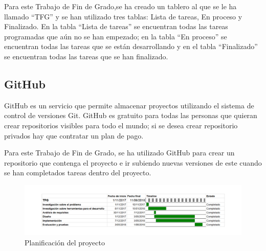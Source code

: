 Para este Trabajo de Fin de Grado,se ha creado un tablero al que se le ha llamado \enquote{TFG} y se han utilizado tres tablas: Lista de tareas, En proceso y Finalizado. En la tabla \enquote{Lista de tareas} se encuentran todas las tareas programadas que aún no se han empezado; en la tabla \enquote{En proceso} se encuentran todas las tareas que se están desarrollando y en el tabla \enquote{Finalizado} se encuentran todas las tareas que se han finalizado.
\subsection{GitHub}
GitHub \cite{github} es un servicio que permite almacenar proyectos utilizando el sistema de control de versiones Git. GitHub es gratuito para todas las personas que quieran crear repositorios visibles para todo el mundo; si se desea crear repositorio privados hay que contratar un plan de pago.\newline

Para este Trabajo de Fin de Grado, se ha utilizado GitHub para crear un repositorio que contenga el proyecto e ir subiendo nuevas versiones de este cuando se han completados tareas dentro del proyecto.\newline
\newpage
\begin{figure}[H]
	\centering
	\includegraphics[scale=0.55,angle=90]{imagenes/Gantt.png}
	\caption{Planificación del proyecto}
	\label{fig:gantt}
\end{figure}
